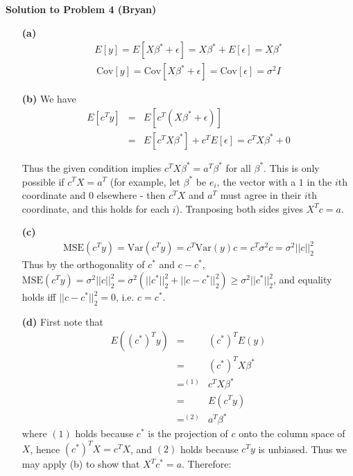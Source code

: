 \documentclass[11pt]{article}
\begin{document}
\begin{framed}
{\bf\large Solution to Problem 4 (Bryan)}




\begin{enumerate}
\item[{\bf (a)}]
\begin{eqnarray*}
E[y]
    = E[X\beta^{*}+\epsilon]
    = X\beta^{*}+E[\epsilon]
    = X\beta^{*}
\end{eqnarray*}
\begin{eqnarray*}
\mbox{Cov}[y]
    = \mbox{Cov}[X\beta^{*}+\epsilon]
    = \mbox{Cov}[\epsilon]
    = \sigma^{2}I
\end{eqnarray*}
\noindent
\item[{\bf (b)}] We have 
\begin{eqnarray*}
E[c^{T}y] & = & E[c^{T}(X\beta^{*}+\epsilon)]\\
 & = & E[c^{T}X\beta^{*}]+c^{T}E[\epsilon]
   =   c^{T}X\beta^{*}+0
\end{eqnarray*}


Thus the given condition implies $c^{T}X\beta^{*}=a^{T}\beta^{*}$
for all $\beta^{*}$. This is only possible if $c^{T}X=a^{T}$ (for
example, let $\beta^{*}$ be $e_{i}$, the vector with a $1$ in the $i$th coordinate and $0$ elsewhere - then $c^{T}X$ and $a^{T}$ must agree in their $i$th coordinate,
and this holds for each $i$). Tranposing both sides gives $X^{T}c=a$.
\item[{\bf (c)}]
\begin{eqnarray*}
\mbox{MSE}(c^{T}y)
    = \mbox{Var}(c^{T}y)
    = c^{T}\mbox{Var}(y)c
    = c^{T}\sigma^{2}c
    = \sigma^{2}||c||_{2}^{2}
\end{eqnarray*}
Thus by the orthogonality of $c^{*}$ and
$c-c^{*}$,
$\mbox{MSE}(c^{T}y)
    =\sigma^{2}||c||_{2}^{2}
    =\sigma^{2}(||c^{*}||_{2}^{2}+||c-c^{*}||_{2}^{2})
    \ge\sigma^{2}||c^{*}||_{2}^{2}$,
and equality holds iff $||c-c^{*}||_{2}^{2}=0$, i.e. $c=c^{*}$.
\item[{\bf (d)}]
First note that 
\begin{eqnarray*}
E((c^{*})^{T}y) & = & (c^{*})^{T}E(y)\\
 & = & (c^{*})^{T}X\beta^{*}\\
 & =^{(1)} & c{}^{T}X\beta^{*}\\
 & = & E(c^{T}y)\\
 & =^{(2)} & a^{T}\beta^{*}
\end{eqnarray*}
 where $(1)$ holds because $c^{*}$ is the projection of $c$ onto
the column space of $X$, hence $(c^{*})^{T}X=c^{T}X$, and $(2)$
holds because $c^{T}y$ is unbiased. Thus we may apply (b) to show
that $X^{T}c^{*}=a$. Therefore:


\end{enumerate}
\end{framed}
\end{document}
